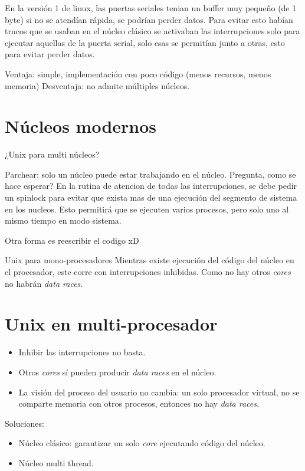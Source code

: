 En la versión 1 de linux, las puertas seriales tenian un buffer muy pequeño (de 1 byte) si no se atendían rápida, se podrían perder datos. Para evitar esto habían trucos que se usaban en el núcleo clásico se activaban las interrupciones solo para ejecutar aquellas de la puerta serial, solo esas se permitían junto a otras, esto para evitar perder datos.

Ventaja: simple, implementación con poco código (menos recursos, menos memoria)
Desventaja: no admite múltiples núcleos.

\section{Núcleos modernos}

¿Unix para multi núcleos?

Parchear: solo un núcleo puede estar trabajando en el núcleo. Pregunta, como se hace esperar? En la rutina de atencion de todas las interrupciones, se debe pedir un spinlock para evitar que exista mas de una ejecución del segmento de sistema en los nucleos. Esto permitirá que se ejecuten varios procesos, pero solo uno al mismo tiempo en modo sistema.

Otra forma es reescribir el codigo xD


Unix para mono-procesadores
Mientras existe ejecución del código del núcleo en el procesador, este corre con interrupciones inhibidas. Como no hay otros \textit{cores} no habrán \textit{data races}.

\section{Unix en multi-procesador}

\begin{itemize}
	\item Inhibir las interrupciones no basta.
	\item Otros \textit{cores} sí pueden producir \textit{data races} en el núcleo.
	\item La visión del proceso del usuario no cambia: un solo procesador virtual, no se comparte memoria con otros procesos, entonces no hay \textit{data races}.
\end{itemize}

Soluciones:
\begin{itemize}
	\item Núcleo clásico: garantizar un solo \textit{core} ejecutando código del núcleo.
	\item Núcleo multi thread.
\end{itemize}

